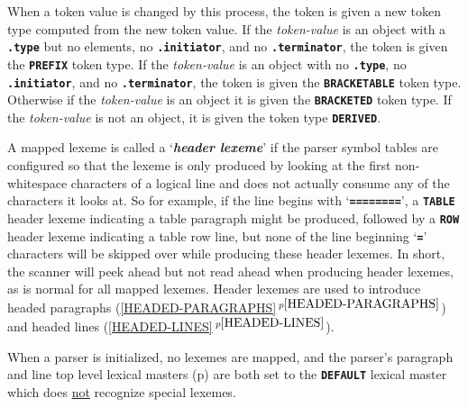\documentclass[12pt]{article}
\newcommand{\TT}[1]{{\tt \bfseries #1}}
\newcommand{\key}[1]{{\bf \em #1}\index{#1}}
\newcommand{\itemref}[1]{\ref{#1}$\,^{p\pageref{#1}}$}
\newcommand{\pagref}[1]{p\pageref{#1}}
\begin{document}
When a token value is changed by this process, the token is
given a new token type computed from the new token value.%
\label{MAPPED-LEXEME-TOKEN-TYPE}
If the {\em token-value} is an object with a \TT{.type} but
no elements, no \TT{.initiator}, and no \TT{.terminator},
the token is given the \TT{PREFIX} token type.
If the {\em token-value} is an object with no \TT{.type},
 no \TT{.initiator}, and no \TT{.terminator},
the token is given the \TT{BRACKETABLE} token type.
Otherwise if the {\em token-value} is an object it is given
the \TT{BRACKETED} token type.
If the {\em token-value} is not an object, it is given the token
type \TT{DERIVED}.

A mapped lexeme is called a `\key{header lexeme}' if the parser
symbol tables are configured so that the lexeme is only
produced by looking
at the first non-whitespace characters of a logical line and does
not actually consume any of the characters it looks at.
So for example, if the line begins with `\TT{========}',
a \TT{TABLE} header lexeme indicating
a table paragraph might be produced, followed by a \TT{ROW} header lexeme
indicating a table row line, but none of the line beginning `\TT{=}'
characters will be skipped over while producing these header lexemes.
In short, the scanner will peek ahead but not read ahead when
producing header lexemes, as is normal for all mapped lexemes.
Header lexemes are used to introduce
headed paragraphs (\itemref{HEADED-PARAGRAPHS})
and headed lines (\itemref{HEADED-LINES}).


When a parser is initialized, no lexemes are mapped,
and the parser's paragraph and
line top level lexical masters (\pagref{LEXICAL-MASTER-PARAMETERS})
are both set to the \TT{DEFAULT} lexical master
which does \underline{not} recognize special lexemes.
\end{document}
